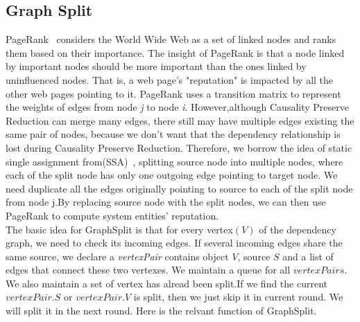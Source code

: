 \subsection{Graph Split}
PageRank~\cite{pagerank} considers the World Wide Web as a set of linked nodes and ranks them based on their importance. The insight of PageRank is that a node linked by important nodes should be more important than the ones linked by uninfluenced nodes. That is, a web page's "reputation" is impacted by all the other web pages pointing to it. PageRank uses a transition matrix to represent the weights of edges from node \textit{j} to node \textit{i}. However,although Causality Preserve Reduction can merge many edges, there still may have multiple edges existing the same pair of nodes, because we don't want that the dependency relationship is lost during Causality Preserve Reduction. Therefore, we borrow the idea of static single assignment from(SSA)~\cite{nielson2004principles}, splitting source node  into multiple nodes, where each of the split node has only one outgoing edge pointing to target node. We need duplicate all the edges originally pointing to source to each of the split node from node j.By replacing source node with the split nodes, we can then use PageRank to compute system entities' reputation.\\
The basic idea for GraphSplit is that for every vertex$(V)$ of the dependency graph, we need to check its incoming edges. If several incoming edges share the same source, we declare a \textit{vertexPair} contains object $V$, source $S$ and a list of edges that connect these two vertexes. We maintain a queue for all $vertexPairs$. We also maintain a set of vertex has alread been  split.If we find the current $vertexPair.S$ or $vertexPair.V$ is split, then we just skip it in current round. We will split it in the next round. Here is the relvant function of GraphSplit.\clearpage

